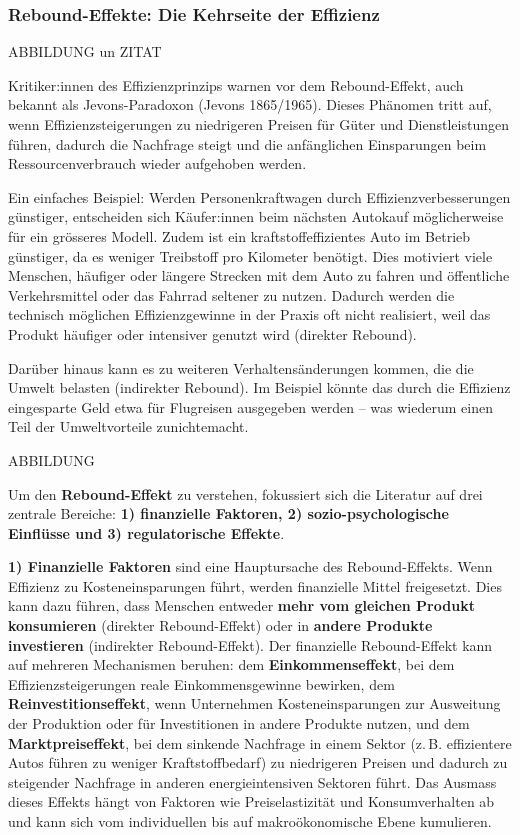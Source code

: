 \documentclass[
  letterpaper,
  DIV=11,
  numbers=noendperiod]{scrartcl}
\begin{document}
\subsubsection{Rebound-Effekte: Die Kehrseite der
Effizienz}\label{rebound-effekte-die-kehrseite-der-effizienz}

ABBILDUNG un ZITAT

Kritiker:innen des Effizienzprinzips warnen vor dem Rebound-Effekt, auch
bekannt als Jevons-Paradoxon (Jevons 1865/1965). Dieses Phänomen tritt
auf, wenn Effizienzsteigerungen zu niedrigeren Preisen für Güter und
Dienstleistungen führen, dadurch die Nachfrage steigt und die
anfänglichen Einsparungen beim Ressourcenverbrauch wieder aufgehoben
werden.

Ein einfaches Beispiel: Werden Personenkraftwagen durch
Effizienzverbesserungen günstiger, entscheiden sich Käufer:innen beim
nächsten Autokauf möglicherweise für ein grösseres Modell. Zudem ist ein
kraftstoffeffizientes Auto im Betrieb günstiger, da es weniger
Treibstoff pro Kilometer benötigt. Dies motiviert viele Menschen,
häufiger oder längere Strecken mit dem Auto zu fahren und öffentliche
Verkehrsmittel oder das Fahrrad seltener zu nutzen. Dadurch werden die
technisch möglichen Effizienzgewinne in der Praxis oft nicht realisiert,
weil das Produkt häufiger oder intensiver genutzt wird (direkter
Rebound).

Darüber hinaus kann es zu weiteren Verhaltensänderungen kommen, die die
Umwelt belasten (indirekter Rebound). Im Beispiel könnte das durch die
Effizienz eingesparte Geld etwa für Flugreisen ausgegeben werden -- was
wiederum einen Teil der Umweltvorteile zunichtemacht.

ABBILDUNG

Um den \textbf{Rebound-Effekt} zu verstehen, fokussiert sich die
Literatur auf drei zentrale Bereiche: \textbf{1) finanzielle Faktoren,
2) sozio-psychologische Einflüsse und 3) regulatorische Effekte}.

\textbf{1) Finanzielle Faktoren} sind eine Hauptursache des
Rebound-Effekts. Wenn Effizienz zu Kosteneinsparungen führt, werden
finanzielle Mittel freigesetzt. Dies kann dazu führen, dass Menschen
entweder \textbf{mehr vom gleichen Produkt konsumieren} (direkter
Rebound-Effekt) oder in \textbf{andere Produkte investieren} (indirekter
Rebound-Effekt). Der finanzielle Rebound-Effekt kann auf mehreren
Mechanismen beruhen: dem \textbf{Einkommenseffekt}, bei dem
Effizienzsteigerungen reale Einkommensgewinne bewirken, dem
\textbf{Reinvestitionseffekt}, wenn Unternehmen Kosteneinsparungen zur
Ausweitung der Produktion oder für Investitionen in andere Produkte
nutzen, und dem \textbf{Marktpreiseffekt}, bei dem sinkende Nachfrage in
einem Sektor (z.\,B. effizientere Autos führen zu weniger
Kraftstoffbedarf) zu niedrigeren Preisen und dadurch zu steigender
Nachfrage in anderen energieintensiven Sektoren führt. Das Ausmass
dieses Effekts hängt von Faktoren wie Preiselastizität und
Konsumverhalten ab und kann sich vom individuellen bis auf
makroökonomische Ebene kumulieren.
\end{document}
